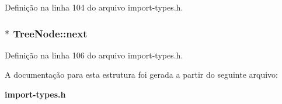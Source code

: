 Definição na linha 104 do arquivo import-\/types.\+h.

\subsubsection[{next}]{$\ast$ Tree\+Node\+::next}\label{struct_tree_node_a450da53055399f97e47b604d9e9e6ed6}


Definição na linha 106 do arquivo import-\/types.\+h.



A documentação para esta estrutura foi gerada a partir do seguinte arquivo\+:\begin{DoxyCompactItemize}
\item 
{\bf import-\/types.\+h}\end{DoxyCompactItemize}
